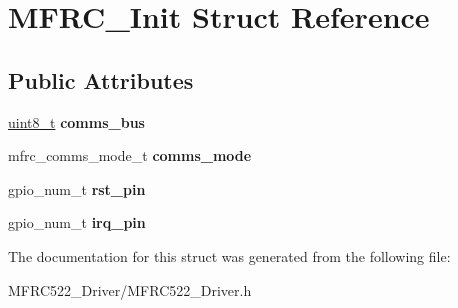 \hypertarget{structMFRC__Init}{}\section{M\+F\+R\+C\+\_\+\+Init Struct Reference}
\label{structMFRC__Init}
\subsection*{Public Attributes}
\begin{DoxyCompactItemize}
\item 
\mbox{\label{structMFRC__Init_a5f0bbc528912b4a8d95b964dcde31837}} 
\hyperlink{vl53l0x__types_8h_aba7bc1797add20fe3efdf37ced1182c5}{uint8\+\_\+t} {\bfseries comms\+\_\+bus}
\item 
\mbox{\label{structMFRC__Init_a98dfa94adfc08ed5bd7c28d90ec34862}} 
mfrc\+\_\+comms\+\_\+mode\+\_\+t {\bfseries comms\+\_\+mode}
\item 
\mbox{\label{structMFRC__Init_a6e9c5405f2685795509f68a9263f3a12}} 
gpio\+\_\+num\+\_\+t {\bfseries rst\+\_\+pin}
\item 
\mbox{\label{structMFRC__Init_a3a2a8c560083711e218a8e1e5d4aac99}} 
gpio\+\_\+num\+\_\+t {\bfseries irq\+\_\+pin}
\end{DoxyCompactItemize}


The documentation for this struct was generated from the following file\+:\begin{DoxyCompactItemize}
\item 
M\+F\+R\+C522\+\_\+\+Driver/M\+F\+R\+C522\+\_\+\+Driver.\+h\end{DoxyCompactItemize}
